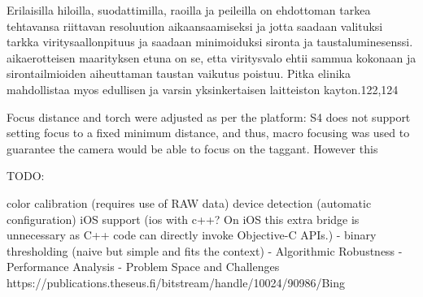 \documentclass[thesis.tex]{subfiles}
\begin{document}
Erilaisilla hiloilla, suodattimilla, raoilla ja peileilla on ehdottoman tarkea tehtavansa riittavan resoluution aikaansaamiseksi ja jotta saadaan valituksi tarkka viritysaallonpituus ja saadaan minimoiduksi sironta ja taustaluminesenssi. aikaerotteisen maarityksen etuna on se, etta viritysvalo ehtii sammua kokonaan ja sirontailmioiden aiheuttaman taustan vaikutus poistuu. Pitka elinika mahdollistaa myos edullisen ja varsin yksinkertaisen laitteiston kayton.122,124

Focus distance and torch were adjusted as per the platform: S4 does not support setting focus to a fixed minimum distance, and thus, macro focusing was used to guarantee the camera would be able to focus on the taggant. However this

TODO:

color calibration (requires use of RAW data)
device detection (automatic configuration)
iOS support (ios with c++? On iOS this extra bridge is unnecessary as C++ code can directly invoke Objective-C APIs.)
- binary thresholding (naive but simple and fits the context)
- Algorithmic Robustness
- Performance Analysis
- Problem Space and Challenges
https://publications.theseus.fi/bitstream/handle/10024/90986/Bing%



\end{document}
